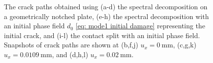 \begin{figure}[htb!]
\begin{subfigure}[b]{0.06\textwidth}
    \vspace{0.15in}
  \end{subfigure}
  \caption{The crack paths obtained using (a-d) the spectral decomposition on a geometrically notched plate, (e-h) the spectral decomposition with an initial phase field $d_0$ \eqref{eq: mode1 initial damage} representing the initial crack, and (i-l) the contact split with an initial phase field. Snapshots of crack paths are shown at (b,f,j) $u_x = \SI{0}{\milli\meter}$, (c,g,k) $u_x = \SI{0.0109}{\milli\meter}$, and (d,h,l) $u_x = \SI{0.02}{\milli\meter}$. }
  \label{fig: Chapter4/mode2_crack_path}
\end{figure}

